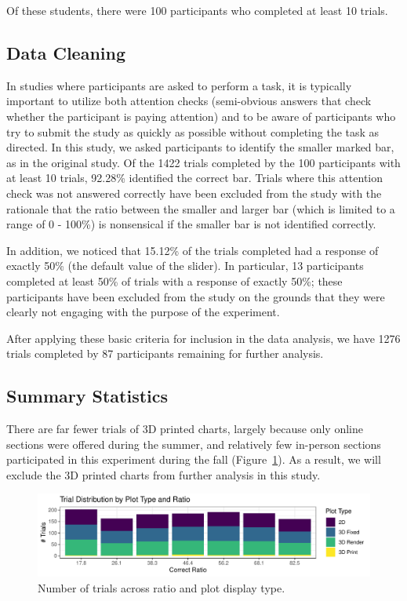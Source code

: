 \documentclass[runningheads
]{llncs}
\begin{document}
Of these students, there were 100 participants who completed at least 10
trials.

\hypertarget{data-cleaning}{%
\subsection{Data Cleaning}\label{data-cleaning}}

In studies where participants are asked to perform a task, it is
typically important to utilize both attention checks (semi-obvious
answers that check whether the participant is paying attention) and to
be aware of participants who try to submit the study as quickly as
possible without completing the task as directed. In this study, we
asked participants to identify the smaller marked bar, as in the
original study. Of the 1422 trials completed by the 100 participants
with at least 10 trials, 92.28\% identified the correct bar. Trials
where this attention check was not answered correctly have been excluded
from the study with the rationale that the ratio between the smaller and
larger bar (which is limited to a range of 0 - 100\%) is nonsensical if
the smaller bar is not identified correctly.

In addition, we noticed that 15.12\% of the trials completed had a
response of exactly 50\% (the default value of the slider). In
particular, 13 participants completed at least 50\% of trials with a
response of exactly 50\%; these participants have been excluded from the
study on the grounds that they were clearly not engaging with the
purpose of the experiment.

After applying these basic criteria for inclusion in the data analysis,
we have 1276 trials completed by 87 participants remaining for further
analysis.

\hypertarget{summary-statistics}{%
\subsection{Summary Statistics}\label{summary-statistics}}

There are far fewer trials of 3D printed charts, largely because only
online sections were offered during the summer, and relatively few
in-person sections participated in this experiment during the fall
(Figure~\ref{fig-summary}). As a result, we will exclude the 3D printed
charts from further analysis in this study.

\begin{figure}

{\centering \includegraphics{index_files/figure-pdf/fig-summary-1.pdf}

}

\caption{\label{fig-summary}Number of trials across ratio and plot
display type.}

\end{figure}
\end{document}
